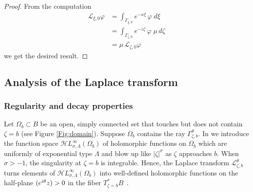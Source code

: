 \documentclass{article}
\let\Re\relax
\DeclareMathOperator{\Re}{Re}
\newcommand{\singexp}[2]{\mathcal{H}L^\infty_{#1, #2}}
\newcommand{\laplace}{\mathcal{L}}
\theoremstyle{definition}
\theoremstyle{plain}
\begin{document}
\begin{proof}
    From the computation 
    \begin{align*}
\laplace_{\xi, 0} \varphi & = \int_{\Gamma_{\xi, 0}} e^{-x\xi}\,\varphi\;d\xi \\
& = \int_{\Gamma_{\zeta, 0}} e^{-z \zeta}\,\varphi\;\mu\,d\zeta \\
& = \mu\,\laplace_{\zeta, 0} \varphi
\end{align*}
we get the desired result. 
\end{proof}
%
\subsection{Analysis of the Laplace transform}\label{sec:laplace_analytic}

\subsubsection{Regularity and decay properties}\label{sec:reg-decay}
%
Let $\Omega_b \subset B$ be an open, simply connected set that touches but does not contain $\zeta=b$ (see Figure \ref{Fig:domain}). Suppose $\Omega_b$ contains the ray $\Gamma_{\zeta,b}^\theta$. In \cite{reg-sing-volterra} we introduce the function space $\singexp{\sigma}{\Lambda}(\Omega_b)$ of holomorphic functions on $\Omega_b$ which are uniformly of exponential type $\Lambda$ and blow up like $|\zeta|^\sigma$ as $\zeta$ approaches $b$. When $\sigma>-1$, the singularity at $\zeta=b$ is integrable. Hence, the Laplace transform $\laplace_{\zeta, b}^\theta$ turns elements of $\singexp{\sigma}{\Lambda}(\Omega_b)$ into well-defined holomorphic functions on the half-plane $\Re(e^{i\theta} z) > 0$ in the fiber $T_{\zeta=b}^*B$~\cite[Section  5.6]{diverg-resurg-i}.
\end{document}
